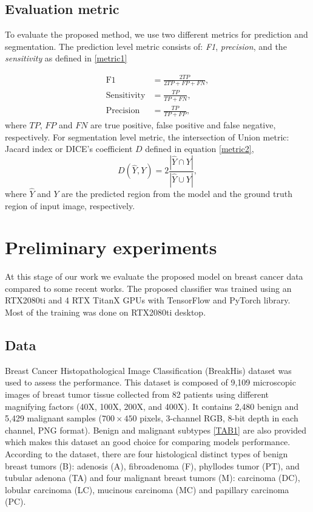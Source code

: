 \documentclass[review]{cvpr}
\begin{document}
\subsection{Evaluation metric}
To evaluate the proposed method, we use two different metrics for prediction and segmentation. The prediction level metric consists of: \textit{F1}, \textit{precision}, and the \textit{sensitivity} as defined in \ref{metric1}

\begin{equation}
\begin{split}
   \text{F1} & = \frac{2TP}{2TP+FP+ FN}, \\
   \text{Sensitivity} & = \frac{TP}{TP+FN}, \\
   \text{Precision} & = \frac{TP}{TP+FP} ,
   \label{metric1}
\end{split}
\end{equation}
where $TP$, $FP$ and $FN$ are true positive, false positive and false negative, respectively.
For segmentation level metric, the intersection of Union metric: Jacard index or DICE's coefficient $D$ defined in equation \ref{metric2},
\begin{equation}
    D(\hat{Y},Y)=2\frac{|\hat{Y} \cap Y|}{|\hat{Y} \cup Y|},
    \label{metric2}
\end{equation}
where $\hat{Y}$ and $Y$ are the predicted region from the model and the ground truth region of input image, respectively.

\section{Preliminary experiments}
At this stage of our work we evaluate the proposed model on breast cancer data compared to some recent works. The proposed classifier was trained using an RTX2080ti and 4 RTX TitanX GPUs  with TensorFlow and PyTorch library. Most of the training was done on RTX2080ti desktop.
\subsection{Data}
Breast Cancer Histopathological Image Classification (BreakHis) dataset \cite{BENHAMMOU20209} was used to assess the performance. This dataset is composed of 9,109 microscopic images of breast tumor tissue collected from 82 patients using different magnifying factors (40X, 100X, 200X, and 400X). It contains 2,480  benign and 5,429 malignant samples ($700\times 450$ pixels, 3-channel RGB, 8-bit depth in each channel, PNG format). Benign and malignant subtypes \ref{TAB1} are also provided which makes this dataset an good choice for comparing models performance. According to the dataset, there are four histological distinct types of benign breast tumors (B): adenosis (A), fibroadenoma (F), phyllodes tumor (PT), and tubular adenona (TA) and four malignant breast tumors (M): carcinoma (DC), lobular carcinoma (LC), mucinous carcinoma (MC) and papillary carcinoma (PC). 
\end{document}
